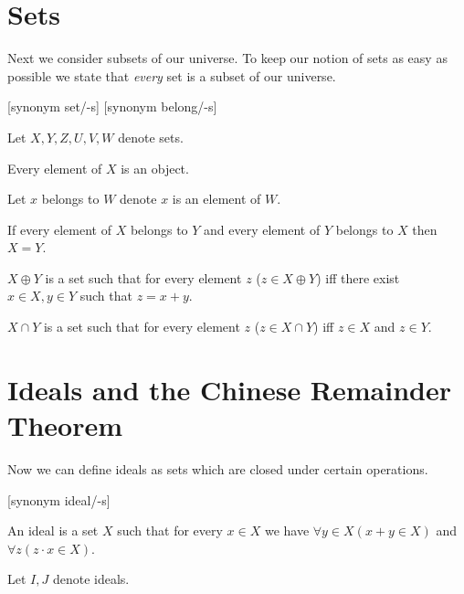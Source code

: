 \documentclass{article}
\begin{document}
  \section{Sets}

  Next we consider subsets of our universe. To keep our notion of sets as easy as possible we state that \textit{every} set is a subset of our universe.

  \begin{forthel}

    [synonym set/-s] [synonym belong/-s]

    Let $X,Y,Z,U,V,W$ denote sets.

    \begin{axiom}
      Every element of $X$ is an object.
    \end{axiom}

    Let $x$ belongs to $W$ denote $x$ is an element of $W$.

    \begin{axiom}[SetEq]
      If every element of $X$ belongs to $Y$ and every element of $Y$ belongs to $X$ then $X = Y$.
    \end{axiom}

    \begin{definition}[DefSum]
      $X \oplus Y$ is a set such that for every element $z$ ($z \in X \oplus Y$) iff there exist $x \in X, y \in Y$ such that $z = x + y$.
    \end{definition}

    \begin{definition}[DefSInt]
      $X \cap Y$ is a set such that for every element $z$ ($z \in X \cap Y$) iff $z \in X$ and $z \in Y$.
    \end{definition}
  \end{forthel}


  \section{Ideals and the Chinese Remainder Theorem}

  Now we can define ideals as sets which are closed under certain operations.

  \begin{forthel}

    [synonym ideal/-s]

    \begin{definition}[DefIdeal]
      An ideal is a set $X$ such that for every $x \in X$ we have
        $\forall y \in X (x + y \in X)$ and
        $\forall z (z \cdot x \in X)$.
    \end{definition}

    Let $I,J$ denote ideals.
  \end{forthel}
\end{document}
